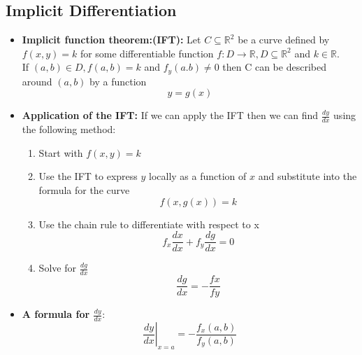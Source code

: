 \documentclass{article}
\begin{document}
  \subsection*{Implicit Differentiation}
  \begin{itemize}
    \item \textbf{Implicit function theorem:(IFT):} Let $C \subseteq \mathbb{R}^2$ be a curve defined by $f(x,y) = k$ for some differentiable function $f: D \rightarrow \mathbb{R}, D \subseteq \mathbb{R}^2$ and $k \in \mathbb{R}$.\\
    If $(a,b) \in D, f(a,b) = k$ and $f_y(a.b) \neq 0$ then C can be described around $(a,b)$ by a function
    $$
      y = g(x)
    $$

    \item \textbf{Application of the IFT:} If we can apply the IFT then we can find $\frac{dy}{dx}$ using the following method:
      \begin{enumerate}
        \item Start with $f(x,y) = k$
        \item Use the IFT to express $y$ locally as a function of $x$ and substitute into the formula for the curve
        $$
          f(x,g(x)) = k
        $$
        \item Use the chain rule to differentiate with respect to x
        $$
          f_x\frac{dx}{dx} + f_y\frac{dg}{dx} = 0
        $$
        \item Solve for $\frac{dg}{dx}$
        $$
          \frac{dg}{dx} = -\frac{fx}{fy}
        $$
      \end{enumerate}

      \item \textbf{A formula for $\frac{dy}{dx}$}:
        $$
          \left. \frac{dy}{dx} \right|_{x=a} = - \frac{f_x(a, b)}{f_y(a, b)}
        $$

  \end{itemize}
\end{document}
